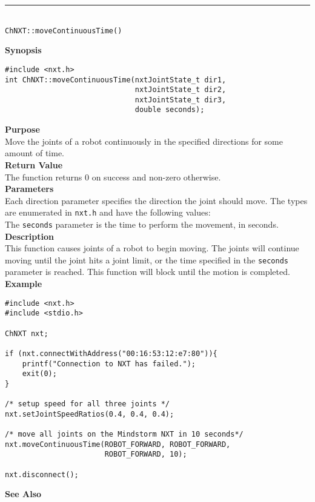 \noindent
\vspace{5pt}
\rule{4.5in}{0.015in}\\
\noindent
{\LARGE \texttt{ChNXT::moveContinuousTime()} }\\


\noindent
{\bf Synopsis}
\vspace{-8pt}
\begin{verbatim}
#include <nxt.h>
int ChNXT::moveContinuousTime(nxtJointState_t dir1, 
                              nxtJointState_t dir2, 
                              nxtJointState_t dir3, 
                              double seconds);
\end{verbatim}

\noindent
{\bf Purpose}\\
Move the joints of a robot continuously in the specified directions for some amount of time.\\

\noindent
{\bf Return Value}\\
The function returns 0 on success and non-zero otherwise.\\

\noindent
{\bf Parameters}\\
Each direction parameter specifies the direction the joint should 
move. The types are enumerated in \texttt{nxt.h} and have the 
following values:\\  
\noindent
The \texttt{seconds} parameter is the time to perform the movement, in seconds.
\\

\noindent
{\bf Description}\\
This function causes joints of a robot to begin moving. The joints
will continue moving until the joint hits a joint limit, or the 
time specified in the \texttt{seconds} parameter is reached. This 
function will block until the motion is completed.\\

\noindent
{\bf Example}
\begin{verbatim}
#include <nxt.h> 
#include <stdio.h>

ChNXT nxt;

if (nxt.connectWithAddress("00:16:53:12:e7:80")){
    printf("Connection to NXT has failed.");
    exit(0);
}
 
/* setup speed for all three joints */
nxt.setJointSpeedRatios(0.4, 0.4, 0.4);

/* move all joints on the Mindstorm NXT in 10 seconds*/
nxt.moveContinuousTime(ROBOT_FORWARD, ROBOT_FORWARD, 
                       ROBOT_FORWARD, 10);

nxt.disconnect();
\end{verbatim}

\noindent
{\bf See Also}\\
